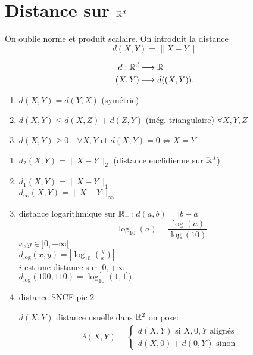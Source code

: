 \documentclass[a4paper]{report}
\begin{document}
\section{Distance sur $\mathbb{R}^d$}
On oublie norme et produit scalaire. On introduit la distance
\[
d(X, Y) = \|X - Y\|
\] 
\begin{prop}
    \begin{align*}
        d: \mathbb{R}^d &\longrightarrow \mathbb{R} \\
        (X, Y) &\longmapsto d((X, Y)) 
    .\end{align*}
    \begin{enumerate}
        \item $d(X, Y) = d(Y, X)$ (symétrie)
        \item $d(X, Y) \le d(X, Z) + d(Z, Y)$ (inég. triangulaire) $\forall X, Y, Z$ 
        \item $d(X, Y) \ge 0 \quad \forall X, Y$ et $d(X, Y) = 0 \iff X = Y$ 
    \end{enumerate}
\end{prop}
\begin{eg}
   \begin{enumerate}
       \item $d_2(X, Y) = \|X - Y\|_2$ (distance euclidienne sur $\mathbb{R}^d$)
       \item $d_1(X, Y) = \|X - Y\|_1$\\
           $d_{\infty}(X, Y) = \|X - Y\|_{\infty}$
       \item distance logarithmique sur $\mathbb{R}_+$:  $d(a, b) = |b - a|$
           \[
               \log_{10}(a) = \frac{\log(a)}{\log(10)}
           \] 
           $x, y \in ]0, +\infty[$\\ 
           $d_{\log}(x, y) = |\log_{10}(\frac{y}{x})|$ \\
           $i$ est une distance sur  $]0, +\infty[$\\
           $d_{\log}(100, 110) = \log_{10}(1,1)$
       \item distance SNCF
           pic 2
           \begin{center}
               
           \end{center}
           $d(X, Y)$ distance usuelle dans  $\mathbb{R}^2$
           on pose:
            \begin{align*}
               \delta(X, Y) = \begin{cases}
                   d(X, Y) \text{ si } X, 0, Y \text{ alignés}\\
                   d(X, 0) + d(0, Y) \text{ sinon }
               \end{cases}
           \end{align*}
   \end{enumerate}
\end{eg}
\end{document}

